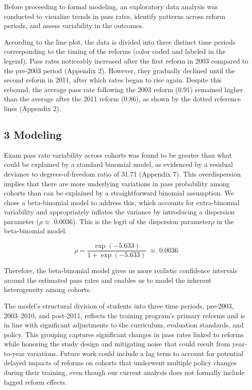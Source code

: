 \documentclass[
]{article}
\begin{document}
Before proceeding to formal modeling, an exploratory data analysis was
conducted to visualize trends in pass rates, identify patterns across
reform periods, and assess variability in the outcomes.

According to the line plot, the data is divided into three distinct time
periods corresponding to the timing of the reforms (color coded and
labeled in the legend). Pass rates noticeably increased after the first
reform in 2003 compared to the pre-2003 period (Appendix 2). However,
they gradually declined until the second reform in 2011, after which
rates began to rise again. Despite this rebound, the average pass rate
following the 2003 reform (0.91) remained higher than the average after
the 2011 reform (0.86), as shown by the dotted reference lines (Appendix
2).

\subsection{3 Modeling}\label{modeling}

Exam pass rate variability across cohorts was found to be greater than
what could be explained by a standard binomial model, as evidenced by a
residual deviance to degrees-of-freedom ratio of 31.71 (Appendix 7).
This overdispersion implies that there are more underlying variations in
pass probability among cohorts than can be explained by a
straightforward binomial assumption. We chose a beta-binomial model to
address this, which accounts for extra-binomial variability and
appropriately inflates the variance by introducing a dispersion
parameter (\(\rho \approx\) 0.0036). This is the logit of the dispersion
parameter\(\rho\) in the beta-binomial model.

\[
\rho = \frac{\exp(-5.633)}{1 + \exp(-5.633)} \;\approx\; 0.0036
\]

Therefore, the beta-binomial model gives us more realistic confidence
intervals around the estimated pass rates and enables us to model the
inherent heterogeneity among cohorts.

The model's structural division of students into three time periods,
pre-2003, 2003--2010, and post-2011, reflects the training program's
primary reforms and is in line with significant adjustments to the
curriculum, evaluation standards, and policy. This grouping captures
significant changes in pass rates linked to reforms while honoring the
study design and mitigating noise that could result from year-to-year
variations. Future work could include a lag term to account for
potential delayed impacts of reforms on cohorts that underwent multiple
policy changes during their training, even though our current analysis
does not formally include lagged reform effects.
\end{document}
